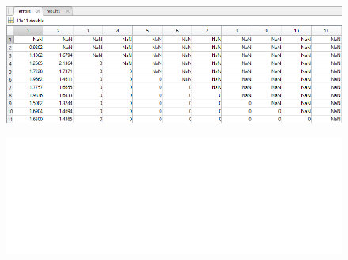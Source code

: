 \documentclass[a4paper, 12pt]{report}
\begin{document}
\begin{figure}[hbt!]
\includegraphics[width=14cm]{lr1 sse dane}
\centering
\end{figure}

\begin{figure}[hbt!]
\includegraphics[width=22cm]{puste}
\centering
\end{figure}
  
\newpage
\end{document}

